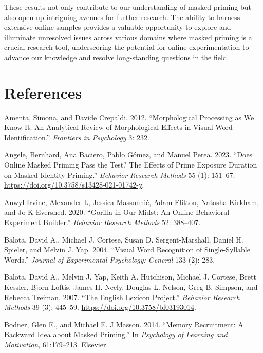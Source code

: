 \documentclass[
]{interact}
\newlength{\cslhangindent}
\newenvironment{CSLReferences}[2] %
 {\begin{list}{}{%
  \setlength{\itemindent}{0pt}
  \setlength{\leftmargin}{0pt}
  \setlength{\parsep}{0pt}
  \ifodd #1
   \setlength{\leftmargin}{\cslhangindent}
   \setlength{\itemindent}{-1\cslhangindent}
  \fi
  \setlength{\itemsep}{#2\baselineskip}}}
 {\end{list}}
\begin{document}
These results not only contribute to our understanding of masked priming
but also open up intriguing avenues for further research. The ability to
harness extensive online samples provides a valuable opportunity to
explore and illuminate unresolved issues across various domains where
masked priming is a crucial research tool, underscoring the potential
for online experimentation to advance our knowledge and resolve
long-standing questions in the field.

\section*{References}\label{references}

\label{refs}
\begin{CSLReferences}{1}{0}
Amenta, Simona, and Davide Crepaldi. 2012. {``Morphological Processing
as We Know It: An Analytical Review of Morphological Effects in Visual
Word Identification.''} \emph{Frontiers in Psychology} 3: 232.

Angele, Bernhard, Ana Baciero, Pablo Gómez, and Manuel Perea. 2023.
{``Does Online Masked Priming Pass the Test? The Effects of Prime
Exposure Duration on Masked Identity Priming.''} \emph{Behavior Research
Methods} 55 (1): 151--67.
\url{https://doi.org/10.3758/s13428-021-01742-y}.

Anwyl-Irvine, Alexander L, Jessica Massonnié, Adam Flitton, Natasha
Kirkham, and Jo K Evershed. 2020. {``Gorilla in Our Midst: An Online
Behavioral Experiment Builder.''} \emph{Behavior Research Methods} 52:
388--407.

Balota, David A., Michael J. Cortese, Susan D. Sergent-Marshall, Daniel
H. Spieler, and Melvin J. Yap. 2004. {``Visual Word Recognition of
Single-Syllable Words.''} \emph{Journal of Experimental Psychology:
General} 133 (2): 283.

Balota, David A., Melvin J. Yap, Keith A. Hutchison, Michael J. Cortese,
Brett Kessler, Bjorn Loftis, James H. Neely, Douglas L. Nelson, Greg B.
Simpson, and Rebecca Treiman. 2007. {``The English Lexicon Project.''}
\emph{Behavior Research Methods} 39 (3): 445--59.
\url{https://doi.org/10.3758/bf03193014}.

Bodner, Glen E., and Michael E. J Masson. 2014. {``Memory Recruitment: A
Backward Idea about Masked Priming.''} In \emph{Psychology of Learning
and Motivation}, 61:179--213. Elsevier.


\end{CSLReferences}
\end{document}
